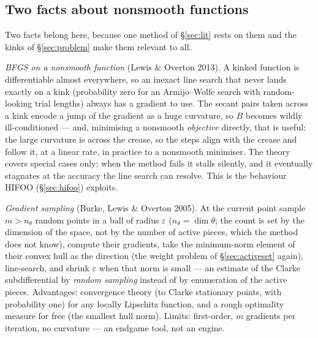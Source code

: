 \documentclass[11pt,a4paper]{article}
\newcommand{\revd}[1]{#1}
\begin{document}
\subsection{Two facts about nonsmooth functions}
\label{sec:nonsmooth}
\revd{Two facts belong here, because one method of \S\ref{sec:lit} rests on them and the
kinks of \S\ref{sec:problem} make them relevant to all.

\emph{BFGS on a nonsmooth function} (Lewis \& Overton 2013).  A kinked function is
differentiable almost everywhere, so an inexact line search that never lands exactly on
a kink (probability zero for an Armijo--Wolfe search with random-looking trial lengths)
always has a gradient to use.  The secant pairs taken across a kink encode a jump of the
gradient as a huge curvature, so $B$ becomes wildly ill-conditioned --- and, minimising
a nonsmooth \emph{objective} directly, that is useful: the large curvature is across the
crease, so the steps align with the crease and follow it, at a linear rate, in practice
to a nonsmooth minimiser.  The theory covers special cases only; when the method fails
it stalls silently, and it eventually stagnates at the accuracy the line search can
resolve.  This is the behaviour HIFOO (\S\ref{sec:hifoo}) exploits.

\emph{Gradient sampling} (Burke, Lewis \& Overton 2005).  At the current point sample
$m>n_\theta$ random points in a ball of radius $\varepsilon$ ($n_\theta=\dim\theta$; the
count is set by the dimension of the space, not by the number of active pieces, which
the method does not know), compute their gradients, take the minimum-norm element of
their convex hull as the direction (the weight problem of \S\ref{sec:activeset} again),
line-search, and shrink $\varepsilon$ when that norm is small --- an estimate of the
Clarke subdifferential by \emph{random sampling} instead of by enumeration of the
active pieces.  Advantages: convergence theory (to Clarke stationary points, with
probability one) for any locally Lipschitz function, and a rough optimality measure for
free (the smallest hull norm).  Limits: first-order, $m$ gradients per iteration, no
curvature --- an endgame tool, not an engine.}
\end{document}
